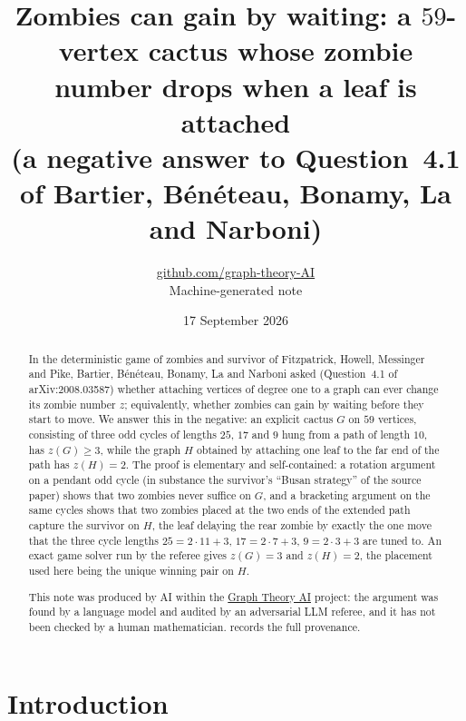 \documentclass[11pt,a4paper]{article}
\title{Zombies can gain by waiting: a $59$-vertex cactus whose zombie number drops when a leaf is attached\\ (a negative answer to Question~4.1 of Bartier, Bénéteau, Bonamy, La and Narboni)}
\author{\href{https://github.com/graph-theory-AI}{github.com/graph-theory-AI}\\[2pt] \normalsize Machine-generated note}
\date{17 September 2026}
\theoremstyle{plain}
\theoremstyle{definition}
\theoremstyle{remark}
\begin{document}
\maketitle

\begin{abstract}
In the deterministic game of zombies and survivor of Fitzpatrick, Howell, Messinger and Pike, Bartier, Bénéteau, Bonamy, La and Narboni asked (Question~4.1 of arXiv:2008.03587) whether attaching vertices of degree one to a graph can ever change its zombie number $z$; equivalently, whether zombies can gain by waiting before they start to move. We answer this in the negative: an explicit cactus $G$ on $59$ vertices, consisting of three odd cycles of lengths $25$, $17$ and $9$ hung from a path of length $10$, has $z(G)\ge3$, while the graph $H$ obtained by attaching one leaf to the far end of the path has $z(H)=2$. The proof is elementary and self-contained: a rotation argument on a pendant odd cycle (in substance the survivor's ``Busan strategy'' of the source paper) shows that two zombies never suffice on $G$, and a bracketing argument on the same cycles shows that two zombies placed at the two ends of the extended path capture the survivor on $H$, the leaf delaying the rear zombie by exactly the one move that the three cycle lengths $25=2\cdot11+3$, $17=2\cdot7+3$, $9=2\cdot3+3$ are tuned to. An exact game solver run by the referee gives $z(G)=3$ and $z(H)=2$, the placement used here being the unique winning pair on $H$.

\medskip\noindent\small
This note was produced by AI within the \href{https://github.com/graph-theory-AI/Graph-Theory-LLM-Proofs}{Graph Theory AI} project:
the argument was found by a language model and audited by an adversarial LLM
referee, and it has not been checked by a human mathematician.
 records the full provenance.
\end{abstract}

\section{Introduction}
\end{document}
